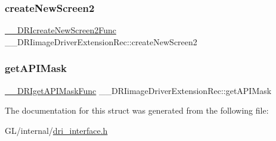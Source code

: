 \subsubsection{\texorpdfstring{create\+New\+Screen2}{createNewScreen2}}
{\footnotesize\ttfamily \hyperlink{dri__interface_8h_a2055c7208f40b9580b75148d76365262}{\+\_\+\+\_\+\+D\+R\+Icreate\+New\+Screen2\+Func} \+\_\+\+\_\+\+D\+R\+Iimage\+Driver\+Extension\+Rec\+::create\+New\+Screen2}

\mbox{\label{struct_____d_r_iimage_driver_extension_rec_af94d99d24ec2133571f7c6930cc4650f}} 
\subsubsection{\texorpdfstring{get\+A\+P\+I\+Mask}{getAPIMask}}
{\footnotesize\ttfamily \hyperlink{dri__interface_8h_a89f080ad71d4ec1295cb23c069e086e6}{\+\_\+\+\_\+\+D\+R\+Iget\+A\+P\+I\+Mask\+Func} \+\_\+\+\_\+\+D\+R\+Iimage\+Driver\+Extension\+Rec\+::get\+A\+P\+I\+Mask}



The documentation for this struct was generated from the following file\+:\begin{DoxyCompactItemize}
\item 
G\+L/internal/\hyperlink{dri__interface_8h}{dri\+\_\+interface.\+h}\end{DoxyCompactItemize}
